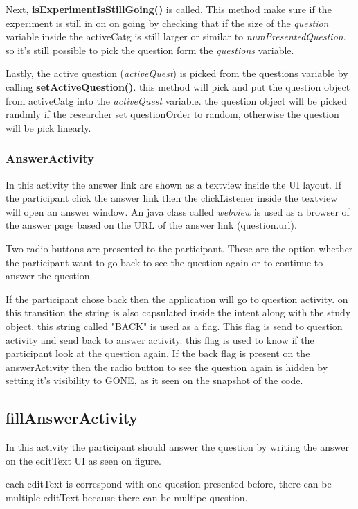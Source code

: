 Next, \textbf{isExperimentIsStillGoing()} is called. This method make sure if the experiment is still in on on going by checking that if the size of the \textit{question} variable inside the activeCatg is still larger or similar to \textit{numPresentedQuestion}. so it's still possible to pick the question form the \textit{questions} variable.

Lastly, the active question (\textit{activeQuest}) is picked from the questions variable by calling \textbf{setActiveQuestion()}. this method will pick and put the question object from activeCatg into the  \textit{activeQuest} variable. the question object will be picked randmly if the researcher set questionOrder to random, otherwise the question will be pick linearly.


\subsubsection{AnswerActivity}
In this activity the answer link are shown as a textview inside the UI layout. If the participant click the answer link then the clickListener inside the textview will open an answer window. An java class called \textit{webview} is used as a browser of the answer page based on the URL of the answer link (question.url).

Two radio buttons are presented to the participant. These are the option whether the participant want to go back to see the question again or to continue to answer the question.

If the participant chose back then the application will go to question activity. on this transition the string is also capsulated inside the intent along with the study object. this string called "BACK" is used as a flag. This flag is send to question activity and send back to answer activity. this flag is used to know if the participant look at the question again.
If the back flag is present on the answerActivity then the radio button to see the question again is hidden by setting it's visibility to GONE, as it seen on the snapshot of the code.

\subsection{fillAnswerActivity}
In this activity the participant should answer the question by writing the answer on the editText UI as seen on figure.

each editText is correspond with one question presented before, there can be multiple editText because there can be multipe question.

